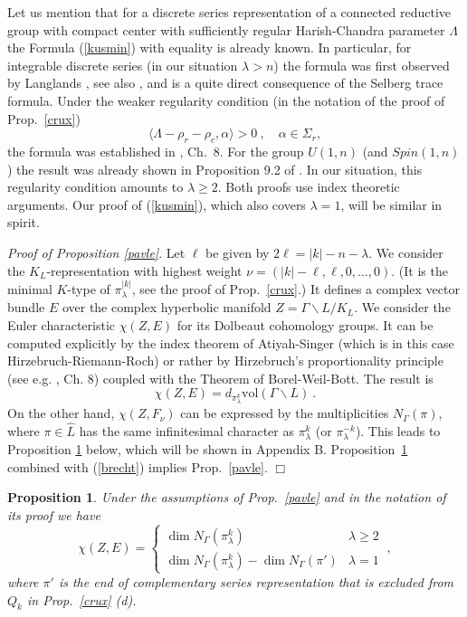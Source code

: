 \documentclass[10]{amsart}
\newtheorem{pro}[thm]{Proposition}
\theoremstyle{remark}
\theoremstyle{definition}
\numberwithin{equation}{section}
\newcommand{\vol}{{\mathrm{vol}}}
\newcommand{\be}{\begin{equation}}
\begin{document}
{Let us mention that for a discrete series representation of a connected reductive group with compact center with sufficiently regular Harish-Chandra parameter $\Lambda$
the Formula (\ref{kusmin}) with equality is already known. In particular, for integrable discrete series (in our situation $\lambda> n$) the formula was first observed by Langlands \cite{La66},
see also \cite{Wa76}, and is a quite direct consequence of the Selberg trace formula. Under the weaker regularity condition (in the notation of the proof of Prop.~\ref{crux})
$$ \langle \Lambda-\rho_r-\rho_c,\alpha\rangle >0 \:,\quad \alpha\in \Sigma_r, $$
the formula was established in \cite{HuPa06}, Ch.~8. For the group $U(1,n)$ (and $Spin(1,n)$) the result was already shown in Proposition 9.2 of \cite{HoPa74}. In our situation, this regularity
condition amounts to $\lambda\ge 2$. Both proofs use index theoretic arguments. Our proof of (\ref{kusmin}), which also covers $\lambda=1$, will be similar in spirit. 

{\em Proof of Proposition \ref{pavle}}. 
Let $\ell$ be given by $2\ell=|k|-n-\lambda$. We consider the $K_L$-representation with highest weight $\nu=(|k|-\ell,\ell,0,\dots,0)$. (It is the minimal $K$-type of $\pi_\lambda^{|k|}$, see the proof of Prop.~\ref{crux}.)
It defines a complex vector bundle $E$ over the complex hyperbolic manifold $Z=\Gamma\backslash L/K_L$. We consider the Euler characteristic $\chi(Z,E)$ for its
Dolbeaut cohomology groups. It can be computed explicitly by the index theorem of Atiyah-Singer (which is in this case Hirzebruch-Riemann-Roch) or rather by Hirzebruch's proportionality principle (see e.g. \cite{HuPa06}, Ch. 8) coupled with the Theorem of Borel-Weil-Bott. The result is
\be \label{brecht}  \chi(Z,E)=  d_{\pi_{\lambda}^{k}}\vol(\Gamma\backslash L)\:.\end{equation}
On the other hand, $\chi(Z,F_\nu)$ can be expressed by the multiplicities $N_\Gamma(\pi)$, where $\pi\in \widehat L$ has the same infinitesimal character
as $\pi_\lambda^{k}$ (or $\pi_\lambda^{-k}$). This leads to Proposition \ref{nichts} below, which will be shown in Appendix B. Proposition~\ref{nichts} combined with (\ref{brecht}) implies Prop.~\ref{pavle}.   
\hfill$\Box$

\begin{pro}\label{nichts} Under the assumptions of Prop.~\ref{pavle} and in the notation of its proof we have 
$$  \chi(Z,E)=\left\{\begin{array}{ll} \dim N_\Gamma(\pi_{\lambda}^{k})&\lambda\ge 2\\ \dim N_\Gamma(\pi_{\lambda}^{k})-\dim N_\Gamma(\pi')&\lambda=1\end{array}\right.  \ ,$$
where $\pi'$ is the end of complementary series representation that is excluded from $Q_k$ in Prop.~\ref{crux} (d).
\end{pro} 

}
\end{document}

